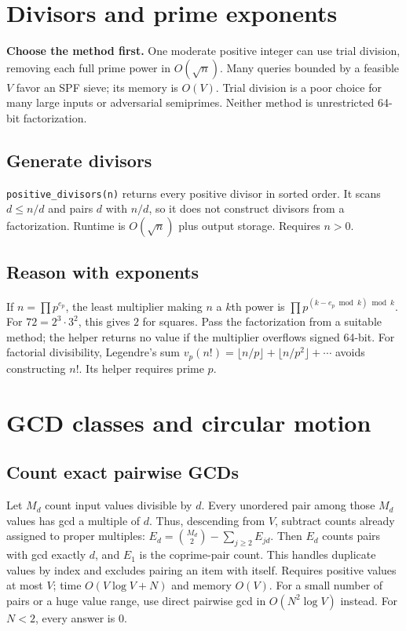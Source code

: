 \section{Divisors and prime exponents}
\textbf{Choose the method first.} One moderate positive integer can use
trial division, removing each full prime power in $O(\sqrt n)$. Many
queries bounded by a feasible $V$ favor an SPF sieve; its memory is
$O(V)$. Trial division is a poor choice for many large inputs or
adversarial semiprimes. Neither method is unrestricted 64-bit
factorization.

\subsection{Generate divisors}
\texttt{positive\_divisors(n)} returns every positive divisor in sorted
order. It scans $d\le n/d$ and pairs $d$ with $n/d$, so it does not
construct divisors from a factorization. Runtime is $O(\sqrt n)$ plus
output storage. Requires $n>0$.

\subsection{Reason with exponents}
If $n=\prod p^{e_p}$, the least multiplier making $n$ a $k$th power is
$\prod p^{(k-e_p\bmod k)\bmod k}$. For $72=2^3\cdot3^2$, this gives
$2$ for squares. Pass the factorization from a suitable method; the
helper returns no value if the multiplier overflows signed 64-bit.
For factorial divisibility, Legendre's sum
$v_p(n!)=\lfloor n/p\rfloor+\lfloor n/p^2\rfloor+\cdots$
avoids constructing $n!$. Its helper requires prime $p$.

\section{GCD classes and circular motion}
\subsection{Count exact pairwise GCDs}
Let $M_d$ count input values divisible by $d$. Every unordered pair
among those $M_d$ values has gcd a multiple of $d$. Thus, descending
from $V$, subtract counts already assigned to proper multiples:
$E_d=\binom{M_d}{2}-\sum_{j\ge2}E_{jd}$. Then $E_d$ counts pairs with
gcd exactly $d$, and $E_1$ is the coprime-pair count. This handles
duplicate values by index and excludes pairing an item with itself.
Requires positive values at most $V$; time $O(V\log V+N)$ and memory
$O(V)$. For a small number of pairs or a huge value range, use direct
pairwise gcd in $O(N^2\log V)$ instead. For $N<2$, every answer is 0.

